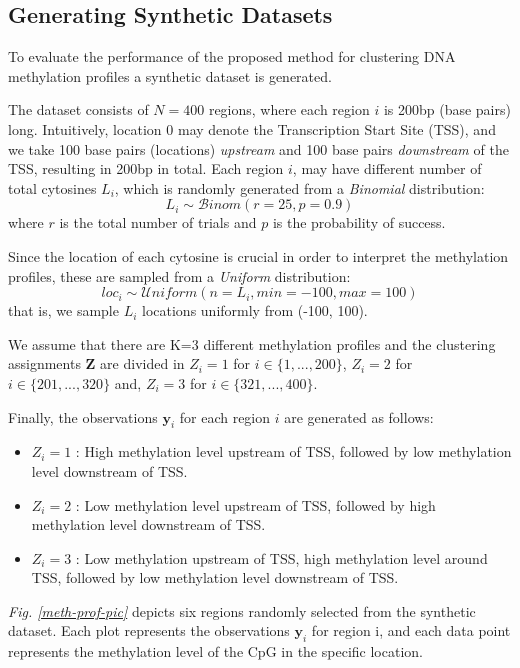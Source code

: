 \subsection{Generating Synthetic Datasets} \label{meth-synth-data-subsect}
To evaluate the performance of the proposed method for clustering DNA methylation profiles a synthetic dataset is generated. 

The dataset consists of $N=400$ regions, where each region $i$ is 200bp (base pairs) long. Intuitively, location 0 may denote the Transcription Start Site (TSS), and we take 100 base pairs (\ie locations) \emph{upstream} and 100 base pairs \emph{downstream} of the TSS, resulting in 200bp in total. Each region $i$, may have different number of total cytosines $L_{i}$, which is randomly generated from a \emph{Binomial} distribution:
\begin{equation}
	L_{i} \sim \mathcal{B}inom(r=25, p=0.9)
\end{equation}
where $r$ is the total number of trials and $p$ is the probability of success.

Since the location of each cytosine is crucial in order to interpret the methylation profiles, these are sampled from a \emph{Uniform} distribution:
\begin{equation}
	loc_{i} \sim \mathcal{U}niform(n=L_{i}, min=-100, max=100)
\end{equation}
that is, we sample $L_{i}$ locations uniformly from (-100, 100). 

We assume that there are K=3 different methylation profiles and the clustering assignments $\mathbf{Z}$ are divided in $Z_{i}=1$ for $i \in \lbrace 1,...,200 \rbrace$, $Z_{i}=2$ for $i \in \lbrace 201,...,320 \rbrace$ and, $Z_{i}=3$ for $i \in \lbrace 321,...,400 \rbrace$. 

Finally, the observations $\mathbf{y}_{i}$ for each region $i$ are generated as follows:
\begin{itemize}
	\item{
		$Z_{i}=1$ : High methylation level upstream of TSS, followed by low methylation level downstream of TSS.
	}
	\item{ 
		$Z_{i}=2$ : Low methylation level upstream of TSS, followed by high methylation level downstream of TSS.
	}
	\item{ 
		$Z_{i}=3$ : Low methylation upstream of TSS, high methylation level around TSS, followed by low methylation level downstream of TSS.
	}
\end{itemize}

\emph{Fig. \ref{meth-prof-pic}} depicts six regions randomly selected from the synthetic dataset. Each plot represents the observations $\mathbf{y}_{i}$ for region i, and each data point represents the methylation level of the CpG in the specific location.

